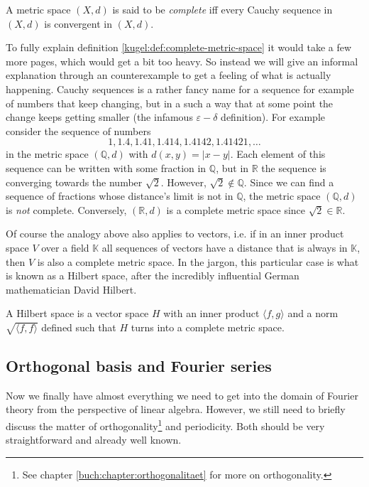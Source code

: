 \begin{definition}
  \label{kugel:def:complete-metric-space}
  A metric space \((X, d)\) is said to be \emph{complete} iff every Cauchy
  sequence in \((X, d)\) is convergent in \((X, d)\).
\end{definition}

To fully explain definition \ref{kugel:def:complete-metric-space} it would
take a few more pages, which would get a bit too heavy. So instead we will
give an informal explanation through an counterexample to get a feeling of
what is actually happening. Cauchy sequences is a rather fancy name for a
sequence for example of numbers that keep changing, but in a such a way that
at some point the change keeps getting smaller (the infamous
\(\varepsilon-\delta\) definition). For example consider the sequence of
numbers
\[
  1,
  1.4,
  1.41,
  1.414,
  1.4142,
  1.41421,
  \ldots
\]
in the metric space \((\mathbb{Q}, d)\) with \(d(x, y) = |x - y|\). Each
element of this sequence can be written with some fraction in \(\mathbb{Q}\),
but in \(\mathbb{R}\) the sequence is converging towards the number
\(\sqrt{2}\). However, \(\sqrt{2} \notin \mathbb{Q}\). Since we can find a
sequence of fractions whose distance's limit is not in \(\mathbb{Q}\), the
metric space \((\mathbb{Q}, d)\) is \emph{not} complete. Conversely,
\((\mathbb{R}, d)\) is a complete metric space since \(\sqrt{2} \in
\mathbb{R}\).

Of course the analogy above also applies to vectors, i.e. if in an inner
product space \(V\) over a field \(\mathbb{K}\) all sequences of vectors have
a distance that is always in \(\mathbb{K}\), then \(V\) is also a complete
metric space. In the jargon, this particular case is what is known as a
Hilbert space, after the incredibly influential German mathematician David
Hilbert.

\begin{definition}
  A Hilbert space is a vector space \(H\) with an inner product \(\langle f, g
  \rangle\) and a norm \(\sqrt{\langle f, f \rangle}\) defined such that \(H\)
  turns into a complete metric space.
\end{definition}

\subsection{Orthogonal basis and Fourier series}

Now we finally have almost everything we need to get into the domain of
Fourier theory from the perspective of linear algebra. However, we still need
to briefly discuss the matter of orthogonality\footnote{See chapter
\ref{buch:chapter:orthogonalitaet} for more on orthogonality.} and
periodicity. Both should be very straightforward and already well known.

